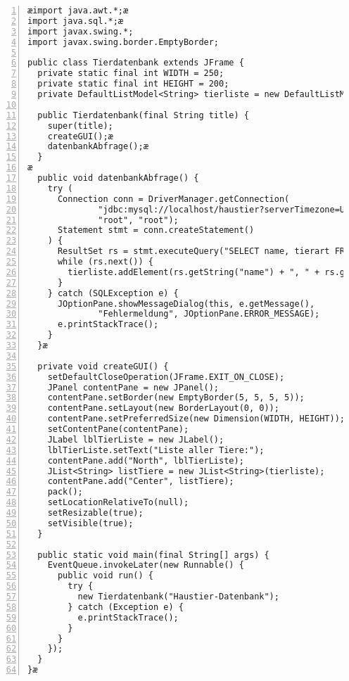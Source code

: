 \begin{lstlisting}[numbers=left, xleftmargin=7mm]
æimport java.awt.*;æ
import java.sql.*;æ
import javax.swing.*;
import javax.swing.border.EmptyBorder;

public class Tierdatenbank extends JFrame {
  private static final int WIDTH = 250;
  private static final int HEIGHT = 200;
  private DefaultListModel<String> tierliste = new DefaultListModel<String>();

  public Tierdatenbank(final String title) {
    super(title);
    createGUI();æ
    datenbankAbfrage();æ
  }
æ  
  public void datenbankAbfrage() {
    try (
      Connection conn = DriverManager.getConnection(
              "jdbc:mysql://localhost/haustier?serverTimezone=UTC&useSSL=false",
              "root", "root"); 
      Statement stmt = conn.createStatement()
    ) {
      ResultSet rs = stmt.executeQuery("SELECT name, tierart FROM tier");
      while (rs.next()) {
        tierliste.addElement(rs.getString("name") + ", " + rs.getString("tierart")); 
      }
    } catch (SQLException e) {
      JOptionPane.showMessageDialog(this, e.getMessage(),
              "Fehlermeldung", JOptionPane.ERROR_MESSAGE);
      e.printStackTrace();
    }
  }æ
  
  private void createGUI() {
    setDefaultCloseOperation(JFrame.EXIT_ON_CLOSE);
    JPanel contentPane = new JPanel();
    contentPane.setBorder(new EmptyBorder(5, 5, 5, 5));
    contentPane.setLayout(new BorderLayout(0, 0));
    contentPane.setPreferredSize(new Dimension(WIDTH, HEIGHT));
    setContentPane(contentPane);
    JLabel lblTierListe = new JLabel();
    lblTierListe.setText("Liste aller Tiere:");
    contentPane.add("North", lblTierListe);
    JList<String> listTiere = new JList<String>(tierliste);
    contentPane.add("Center", listTiere);
    pack();
    setLocationRelativeTo(null);
    setResizable(true);
    setVisible(true);  
  }
  
  public static void main(final String[] args) {
    EventQueue.invokeLater(new Runnable() {
      public void run() {
        try {
          new Tierdatenbank("Haustier-Datenbank");
        } catch (Exception e) {
          e.printStackTrace();
        }
      }
    });
  }
}æ
\end{lstlisting}
